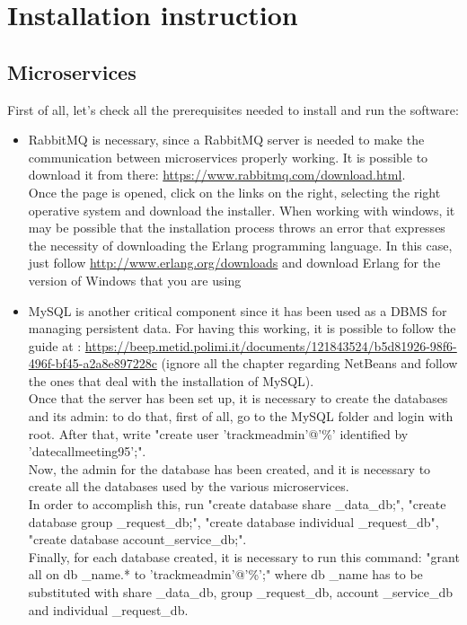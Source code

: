 \section{Installation instruction}
\subsection{Microservices}
First of all, let's check all the prerequisites needed to install and run the software:

\begin{itemize}

\item RabbitMQ is necessary, since a RabbitMQ server is needed to make the communication between microservices properly working.
It is possible to download it from there: \url{https://www.rabbitmq.com/download.html}. \\
Once the page is opened, click on the links on the right, selecting the right operative system and download the installer. 
When working with windows, it may be possible that the installation process throws an error that expresses the necessity of downloading
the Erlang programming language. In this case, just follow \url{http://www.erlang.org/downloads} and download Erlang for the version
of Windows that you are using

\item MySQL is another critical component since it has been used as a DBMS for managing persistent data. For having this working, it
is possible to follow the guide at : \url{https://beep.metid.polimi.it/documents/121843524/b5d81926-98f6-496f-bf45-a2a8e897228c} 
(ignore all the chapter regarding NetBeans and follow the ones that deal with the installation of MySQL). \\
Once that the server has been set up, it is necessary to create the databases and its admin: to do that, first of all, go to the MySQL 
folder and login with root. After that, write "create user 'trackmeadmin'@'\%' identified by 'datecallmeeting95';". \\
Now, the admin for the database has been created, and it is necessary to create all the databases used by the various microservices. \\
In order to accomplish this, run "create database share \_data\_db;", "create database group \_request\_db;", 
"create database individual \_request\_db", "create database account\_service\_db;". \\
Finally, for each database created, it is necessary to run this command: "grant all on db \_name.* to 'trackmeadmin'@'\%';"
where db \_name has to be substituted with share \_data\_db, group \_request\_db, account \_service\_db and individual \_request\_db. 

\end{itemize}


